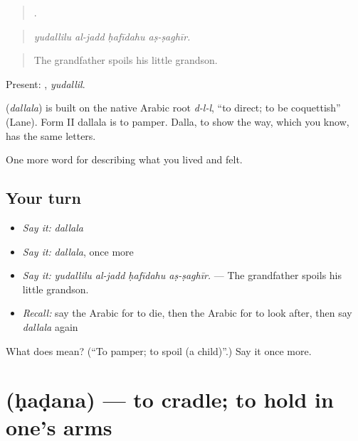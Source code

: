 \begin{quote}
   .
\end{quote}

\begin{quote}
\emph{yudallilu al-jadd ḥafīdahu aṣ-ṣaghīr.}
\end{quote}

\begin{quote}
The grandfather spoils his little grandson.
\end{quote}

Present: , \emph{yudallil}.

\begin{cousinweb}
\textbf{} (\emph{dallala}) is built on the native Arabic root \emph{d-l-l}, \textquotedblleft{}to direct; to be coquettish\textquotedblright{} (Lane). Form II dallala is to pamper. Dalla, to show the way, which you know, has the same letters.
\end{cousinweb}

\begin{grammarlens}[title={What you've built}]
One more word for describing what you lived and felt.
\end{grammarlens}

\subsection*{Your turn}
\begin{itemize}
\raggedright
  \item \emph{Say it:} \emph{dallala}
  \item \emph{Say it:} \emph{dallala}, once more
  \item \emph{Say it:} \emph{yudallilu al-jadd ḥafīdahu aṣ-ṣaghīr.} — The grandfather spoils his little grandson.
  \item \emph{Recall:} say the Arabic for to die, then the Arabic for to look after, then say \emph{dallala} again
\end{itemize}

\begin{tcolorbox}[breakable,colback=teal!4,colframe=teal!35!black,title={Before you move on}]
What does  mean? (\textquotedblleft{}To pamper; to spoil (a child)\textquotedblright{}.) Say it once more.
\end{tcolorbox}
\section[\texorpdfstring{\ar{حضن} (ḥaḍana)}{حضن (ḥaḍana)}]{ (ḥaḍana) — to cradle; to hold in one's arms}

